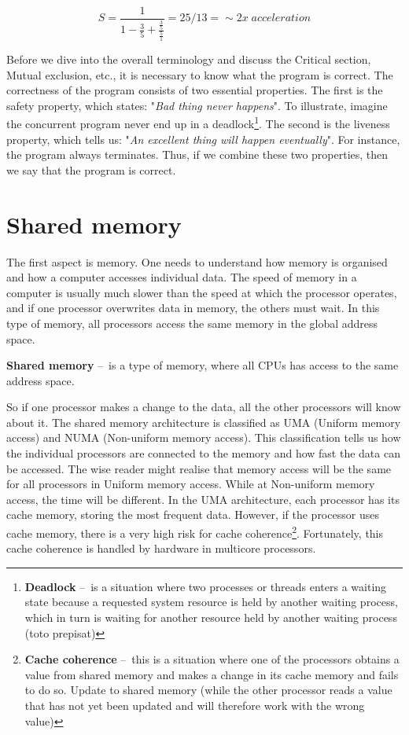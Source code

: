 \begin{equation}
    \label{eqn:amdalhinpractice}
    S = \frac{1}{1 - \frac{3}{5} + \frac{\frac{3}{5}}{\frac{5}{1}}} = 25/13 =\sim 2x \; acceleration
    \tag{2}
\end{equation}

Before we dive into the overall terminology and discuss the Critical section, Mutual exclusion, etc., it is necessary to know what the program is correct. The correctness of the program consists of two essential properties. The first is the safety property, which states: "\emph{Bad thing never happens}". To illustrate, imagine the concurrent program never end up in a deadlock\footnote{\textbf{Deadlock} \---\ is a situation where two processes or threads enters a waiting state because a requested system resource is held by another waiting process, which in turn is waiting for another resource held by another waiting process (toto prepisat)}. The second is the liveness property, which tells us: "\emph{An excellent thing will happen eventually}". For instance, the program always terminates. Thus, if we combine these two properties, then we say that the program is correct.

\section{Shared memory}
\label{04:sharedmemory}

The first aspect is memory. One needs to understand how memory is organised and how a computer accesses individual data. The speed of memory in a computer is usually much slower than the speed at which the processor operates, and if one processor overwrites data in memory, the others must wait. In this type of memory, all processors access the same memory in the global address space. 
\begin{definition}
  \textbf{Shared memory} \---\ is a type of memory, where all CPUs has access to the same address space.
\end{definition}
So if one processor makes a change to the data, all the other processors will know about it. The shared memory architecture is classified as UMA (Uniform memory access) and NUMA (Non-uniform memory access). This classification tells us how the individual processors are connected to the memory and how fast the data can be accessed. The wise reader might realise that memory access will be the same for all processors in Uniform memory access. While at Non-uniform memory access, the time will be different. In the UMA architecture, each processor has its cache memory, storing the most frequent data. However, if the processor uses cache memory, there is a very high risk for cache coherence\footnote {\textbf{Cache coherence} \---\ this is a situation where one of the processors obtains a value from shared memory and makes a change in its cache memory and fails to do so. Update to shared memory (while the other processor reads a value that has not yet been updated and will therefore work with the wrong value)}. Fortunately, this cache coherence is handled by hardware in multicore processors.

